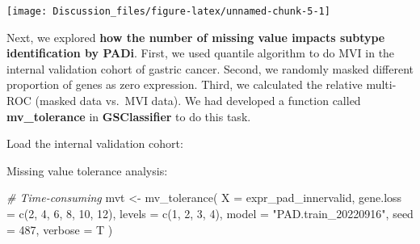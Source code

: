 \documentclass[
  12pt,
]{book}
\newenvironment{Shaded}{\begin{snugshade}}{\end{snugshade}}
\newcommand{\AttributeTok}[1]{\textcolor[rgb]{0.77,0.63,0.00}{#1}}
\newcommand{\CommentTok}[1]{\textcolor[rgb]{0.56,0.35,0.01}{\textit{#1}}}
\newcommand{\DecValTok}[1]{\textcolor[rgb]{0.00,0.00,0.81}{#1}}
\newcommand{\FloatTok}[1]{\textcolor[rgb]{0.00,0.00,0.81}{#1}}
\newcommand{\FunctionTok}[1]{\textcolor[rgb]{0.00,0.00,0.00}{#1}}
\newcommand{\NormalTok}[1]{#1}
\newcommand{\OtherTok}[1]{\textcolor[rgb]{0.56,0.35,0.01}{#1}}
\newcommand{\SpecialCharTok}[1]{\textcolor[rgb]{0.00,0.00,0.00}{#1}}
\newcommand{\StringTok}[1]{\textcolor[rgb]{0.31,0.60,0.02}{#1}}
\begin{document}
\begin{center}\texttt{[image: Discussion\_files/figure-latex/unnamed-chunk-5-1]} \end{center}

Next, we explored \textbf{how the number of missing value impacts subtype identification by PADi}. First, we used quantile algorithm to do MVI in the internal validation cohort of gastric cancer. Second, we randomly masked different proportion of genes as zero expression. Third, we calculated the relative multi-ROC (masked data vs.~MVI data). We had developed a function called \textbf{mv\_tolerance} in \textbf{GSClassifier} to do this task.

Load the internal validation cohort:

\begin{Shaded}
\end{Shaded}

Missing value tolerance analysis:

\begin{Shaded}
\begin{Highlighting}[]
\CommentTok{\# Time{-}consuming}
\NormalTok{mvt }\OtherTok{\textless{}{-}} \FunctionTok{mv\_tolerance}\NormalTok{(}
  \AttributeTok{X =}\NormalTok{ expr\_pad\_innervalid,}
  \AttributeTok{gene.loss =} \FunctionTok{c}\NormalTok{(}\DecValTok{2}\NormalTok{, }\DecValTok{4}\NormalTok{, }\DecValTok{6}\NormalTok{, }\DecValTok{8}\NormalTok{, }\DecValTok{10}\NormalTok{, }\DecValTok{12}\NormalTok{),}
  \AttributeTok{levels =} \FunctionTok{c}\NormalTok{(}\DecValTok{1}\NormalTok{, }\DecValTok{2}\NormalTok{, }\DecValTok{3}\NormalTok{, }\DecValTok{4}\NormalTok{),}
  \AttributeTok{model =} \StringTok{"PAD.train\_20220916"}\NormalTok{,}
  \AttributeTok{seed =} \DecValTok{487}\NormalTok{,}
  \AttributeTok{verbose =}\NormalTok{ T}
\NormalTok{)}
\end{Highlighting}
\end{Shaded}
\end{document}

